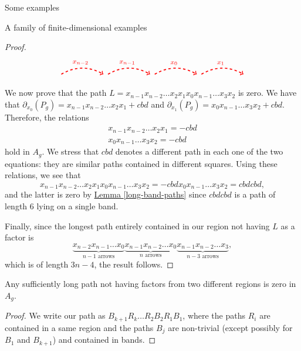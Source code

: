 \begin{chapter}{Some examples}
\begin{section}{A family of finite-dimensional examples}
\begin{proof}
\[\begin{tikzpicture}[text width=1.5mm, font=\footnotesize]
\draw[->, red, dashed, very thick] (-5+1.1, 2.1) to [bend left] node[above]{$\mathclap{x_{n-2}}$} (-5+2.9, 2.1);
\draw[->, red, dashed, very thick] (-3+1.1, 2.1) to [bend left] node[above]{$\mathclap{x_{n-1}}$} (-3+2.9, 2.1);
\draw[->, red, dashed, very thick] (-1+1.1, 2.1) to [bend left] node[above]{$\mathclap{x_{0}}$} (-1+2.9, 2.1);
\draw[->, red, dashed, very thick] (1+1.1, 2.1) to [bend left] node[above]{$\mathclap{x_{1}}$} (1+2.9, 2.1);
\end{tikzpicture}
\]

We now prove that the path $L=x_{n-1}x_{n-2}\dots x_2x_1x_{0}x_{n-1}\dots x_3x_2$ is zero. We have that $\partial_{x_0}(P_g)=x_{n-1}x_{n-2}\dots x_2x_1+cbd$ and $\partial_{x_1}(P_g)=x_{0}x_{n-1}\dots x_3x_2+cbd$. Therefore, the relations
\begin{align*}
x_{n-1}x_{n-2}\dots x_2x_1=-cbd\\
x_{0}x_{n-1}\dots x_3x_2=-cbd
\end{align*}
hold in $A_g$. We stress that $cbd$ denotes a different path in each one of the two equations: they are similar paths contained in different squares. Using these relations, we see that $$x_{n-1}x_{n-2}\dots x_2x_1x_{0}x_{n-1}\dots x_3x_2=-cbdx_{0}x_{n-1}\dots x_3x_2=cbdcbd,$$ and the latter is zero by \hyperref[long-band-paths]{Lemma \ref*{long-band-paths}} since $cbdcbd$ is a path of length 6 lying on a single band. 

Finally, since the longest path entirely contained in our region not having $L$ as a factor is
\[\underbrace{x_{n-2}x_{n-1}\dots x_0}_{\text{$n-1$ arrows}}\underbrace{x_{n-1}x_{n-2}\dots x_0}_{\text{$n$ arrows}}\underbrace{x_{n-1}x_{n-2}\dots x_3}_{\text{$n-3$ arrows}},\]
which is of length $3n-4$, the result follows.
\end{proof}

\begin{lemma} \label{long-br-paths} Any sufficiently long path not having factors from two different regions is zero in $A_g$.
\end{lemma}
\begin{proof} We write our path as $B_{k+1}R_k\dots R_2 B_2 R_1 B_1$, where the paths $R_i$ are contained in a same region and the paths $B_j$ are non-trivial (except possibly for $B_1$ and $B_{k+1}$) and contained in bands.


\end{proof}
\end{section}
\end{chapter}

